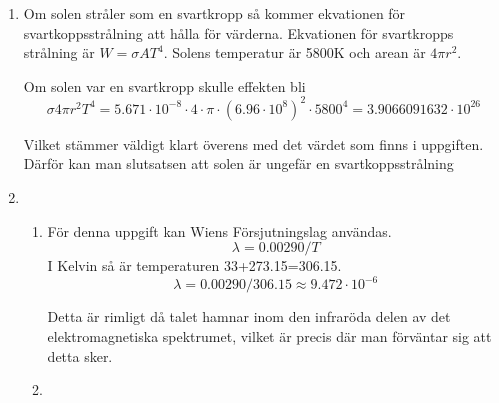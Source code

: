 \documentclass[a4paper,12pt]{article}
\begin{document}
\begin{enumerate}
    \item Om solen stråler som en svartkropp så kommer ekvationen för
          svartkoppsstrålning att hålla för värderna.
          Ekvationen för svartkropps strålning är $W=\sigma A T^4$.
          Solens temperatur är 5800K och arean är $4\pi r^2$.

          Om solen var en svartkropp skulle effekten bli
          $$\sigma 4\pi r^2T^4=5.671\cdot 10^{-8} \cdot 4 \cdot \pi \cdot (6.96\cdot 10^8)^2\cdot 5800^4=3.9066091632\cdot 10^{26}$$

          Vilket stämmer väldigt klart överens med det värdet som finns i uppgiften. Därför
          kan man slutsatsen att solen är ungefär en svartkoppsstrålning

    \item
          \begin{enumerate}
              \item För denna uppgift kan Wiens Försjutningslag användas.
                    $$\lambda=0.00290/T$$
                    I Kelvin så är temperaturen 33+273.15=306.15.
                    $$\lambda=0.00290/306.15\approx 9.472\cdot 10^{-6}$$

                    Detta är rimligt då talet hamnar inom den infraröda delen
                    av det elektromagnetiska spektrumet, vilket är precis där
                    man förväntar sig att detta sker.

              \item
          \end{enumerate}


\end{enumerate}
\end{document}
